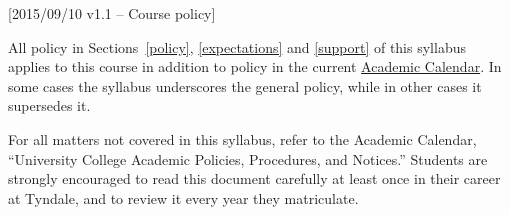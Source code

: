 [2015/09/10 v1.1 -- Course policy]

\newcommand{\AC}{Academic Calendar}
\newcommand{\SecAC}{the \AC}%

All policy in Sections~\ref{policy}, \ref{expectations} and \ref{support} of
this syllabus applies to this course in addition to policy in the current
\href{http://www.tyndale.ca/registrar/calendar}{\AC}. In some cases the
syllabus underscores the general policy, while in other cases it supersedes it.

For all matters not covered in this syllabus, refer to \SecAC, ``University
College Academic Policies, Procedures, and Notices.'' Students are strongly
encouraged to read this document carefully at least once in their career at
Tyndale, and to review it every year they matriculate.
